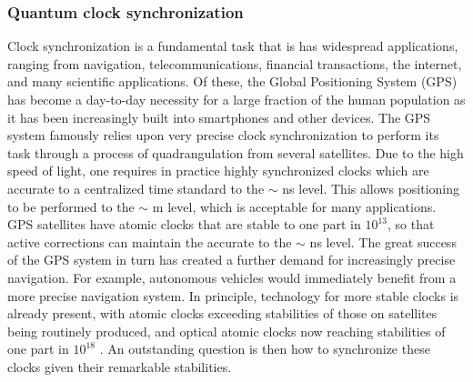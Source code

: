 \documentclass[aps,rmp,reprint,amsmath,amssymb,graphicx,longbibliography]{revtex4-1}
\begin{document}
\subsubsection{Quantum clock synchronization}


Clock synchronization is a fundamental task that is has widespread applications, ranging from navigation, telecommunications, financial transactions, the internet, and many scientific applications. Of these, the Global Positioning System (GPS) has become a day-to-day necessity for a large fraction of the human population as it has been increasingly built into smartphones and other devices. The GPS system famously relies upon very precise clock synchronization to perform its task through a process of quadrangulation from several satellites. Due to the high speed of light, one requires in practice highly synchronized clocks which are accurate to a centralized time standard to the $\sim$ ns level. This allows positioning to be performed to the $\sim$ m level, which is acceptable for many applications. GPS satellites have atomic clocks that are stable to one part in $10^{13}$, so that active corrections can maintain the accurate to the $\sim$ ns level. The great success of the GPS system in turn has created a further demand for increasingly precise navigation. For example, autonomous vehicles would immediately benefit from a more precise navigation system. In principle, technology for more stable clocks is already present, with atomic clocks exceeding stabilities of those on satellites being routinely produced, and optical atomic clocks now reaching stabilities of one part in $10^{18}$  \cite{ludlow2015optical}. An outstanding question is then how to synchronize these clocks given their remarkable stabilities. 
\end{document}
